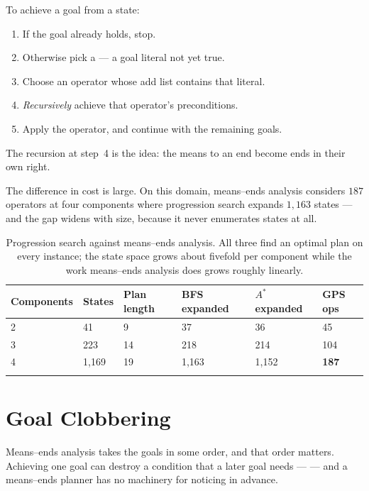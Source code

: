 \begin{definitionbox}
To achieve a goal from a state:
\begin{enumerate}[leftmargin=2.0em, itemsep=1pt, topsep=2pt]
  \item If the goal already holds, stop.
  \item Otherwise pick a  --- a goal literal not yet true.
  \item Choose an operator whose add list contains that literal.
  \item \emph{Recursively} achieve that operator's preconditions.
  \item Apply the operator, and continue with the remaining goals.
\end{enumerate}
The recursion at step~4 is the idea: the means to an end become ends in their own
right.
\end{definitionbox}

The difference in cost is large. On this domain, means--ends analysis considers
$187$ operators at four components where progression search expands $1{,}163$
states --- and the gap widens with size, because it never enumerates states at all.

\smallskip
\noindent\begin{longtable}{@{}L{2.6cm}L{2.0cm}L{2.2cm}L{2.6cm}L{2.4cm}L{2.2cm}@{}}
\toprule
{}
\textbf{Components} & \textbf{States} & \textbf{Plan length} &
\textbf{BFS expanded} & \textbf{$A^{*}$ expanded} & \textbf{GPS ops} \\
\midrule
{} & 41 & 9 & 37 & 36 & 45 \\
3 & 223 & 14 & 218 & 214 & 104 \\
4 & 1{,}169 & 19 & 1{,}163 & 1{,}152 & \textbf{187} \\
\bottomrule
\caption{Progression search against means--ends analysis. All three find an optimal
plan on every instance; the state space grows about fivefold per component while
the work means--ends analysis does grows roughly linearly.}\label{tab:planning}
\end{longtable}

\section{Goal Clobbering}

Means--ends analysis takes the goals in some order, and that order matters. Achieving
one goal can destroy a condition that a later goal needs --- 
--- and a means--ends planner has no machinery for noticing in advance.

